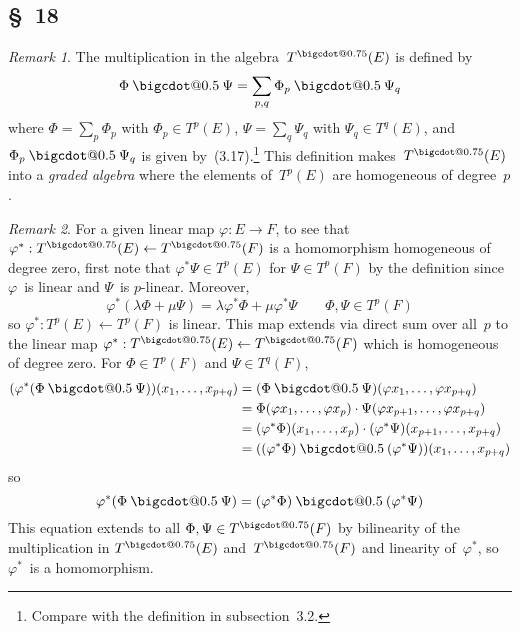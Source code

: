 \documentclass[letterpaper,12pt]{article}
\makeatletter
\newcommand{\from}{\leftarrow}
\newcommand{\bigcdot}[1]{\mathbin{\mathpalette\bigcdot@{#1}}}
\newcommand{\bigcdot@}[2]{%
  \sbox0{$#1\vcenter{}$}%
  \sbox2{$#1\cdot\m@th$}%
  \hbox{%
    \hfil
    \raise\ht0\hbox{%
      \scalebox{#2}{%
        \lower\ht0\hbox{$#1\bullet\m@th$}%
      }%
    }%
    \hfil
  }%
}
\newcommand{\mult}{\cdot}
\newcommand{\fprod}{\bigcdot{0.5}}
\newcommand{\tdot}{\bigcdot{0.75}}
\theoremstyle{definition}
\theoremstyle{remark}
\newtheorem*{rmk}{Remark}
\makeatother
\begin{document}
\subsection*{\S~18}
\begin{rmk}
The multiplication in the algebra~\(T^{\tdot}(E)\) is defined by
\[\Phi\fprod\Psi=\sum_{p,q}\Phi_p\fprod\Psi_q\]
where \(\Phi=\sum_p\Phi_p\) with \(\Phi_p\in T^p(E)\), \(\Psi=\sum_q\Psi_q\) with \(\Psi_q\in T^q(E)\), and \(\Phi_p\fprod\Psi_q\) is given by~(3.17).\footnote{Compare with the definition in subsection~3.2.} This definition makes~\(T^{\tdot}(E)\) into a \emph{graded algebra} where the elements of~\(T^p(E)\) are homogeneous of degree~\(p\).
\end{rmk}

\begin{rmk}
For a given linear map \(\varphi:E\to F\), to see that \(\varphi^*:T^{\tdot}(E)\from T^{\tdot}(F)\) is a homomorphism homogeneous of degree zero, first note that \(\varphi^*\Psi\in T^p(E)\) for \(\Psi\in T^p(F)\) by the definition since \(\varphi\)~is linear and \(\Psi\)~is \(p\)-linear. Moreover,
\[\varphi^*(\lambda\Phi+\mu\Psi)=\lambda\varphi^*\Phi+\mu\varphi^*\Psi\qquad\Phi,\Psi\in T^p(F)\]
so \(\varphi^*:T^p(E)\from T^p(F)\) is linear. This map extends via direct sum over all~\(p\) to the linear map \(\varphi^*:T^{\tdot}(E)\from T^{\tdot}(F)\) which is homogeneous of degree zero. For \(\Phi\in T^p(F)\) and \(\Psi\in T^q(F)\),
\begin{align*}
(\varphi^*(\Phi\fprod\Psi))(x_1,\ldots,x_{p+q})&=(\Phi\fprod\Psi)(\varphi x_1,\ldots,\varphi x_{p+q})\\
	&=\Phi(\varphi x_1,\ldots,\varphi x_p)\mult\Psi(\varphi x_{p+1},\ldots,\varphi x_{p+q})\\
	&=(\varphi^*\Phi)(x_1,\ldots,x_p)\mult(\varphi^*\Psi)(x_{p+1},\ldots,x_{p+q})\\
	&=((\varphi^*\Phi)\fprod(\varphi^*\Psi))(x_1,\ldots,x_{p+q})
\end{align*}
so
\[\varphi^*(\Phi\fprod\Psi)=(\varphi^*\Phi)\fprod(\varphi^*\Psi)\]
This equation extends to all \(\Phi,\Psi\in T^{\tdot}(F)\) by bilinearity of the multiplication in \(T^{\tdot}(E)\) and~\(T^{\tdot}(F)\) and linearity of~\(\varphi^*\), so \(\varphi^*\)~is a homomorphism.
\end{rmk}
\end{document}
